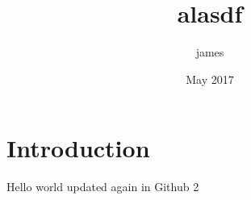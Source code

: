 \documentclass{article}
\title{alasdf}
\author{james }
\date{May 2017}
\begin{document}
\maketitle

\section{Introduction}

Hello world updated again in Github 2
\end{document}
